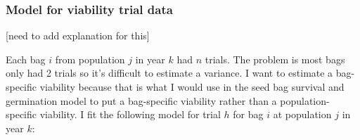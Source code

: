 \documentclass[12pt, oneside, titlepage]{article}   	%
\begin{document}

\subsubsection*{Model for viability trial data}

[need to add explanation for this]

\iffalse
Each bag $i$ from population $j$ in year $k$ had $n$ trials. The problem is most bags only had 2 trials so it's difficult to estimate a variance. I want to estimate a bag-specific viability because that is what I would use in the seed bag survival and germination model to put a bag-specific viability rather than a population-specific viability. I fit the following model for trial $h$ for bag $i$ at population $j$ in year $k$:
\end{document}

